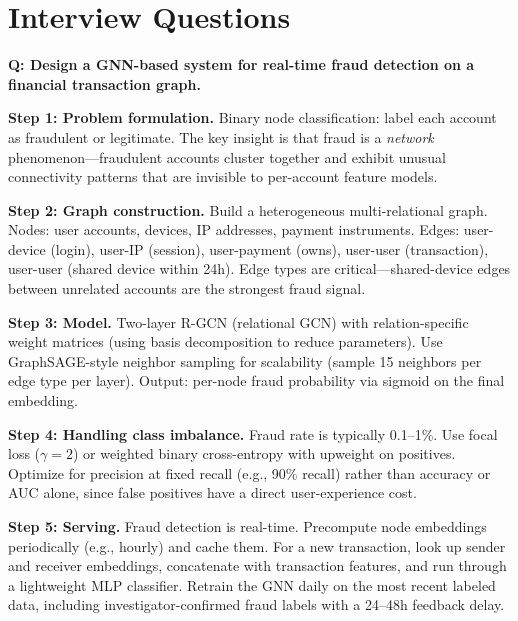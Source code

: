 \section{Interview Questions}
\label{sec:gnn_interview}

\begin{interviewq}
\textbf{Q: Design a GNN-based system for real-time fraud detection on a financial transaction graph.}

 \quad {} \quad \badgefreq{\freqmed}

\stronganswer

\textbf{Step 1: Problem formulation.} Binary node classification: label each account as fraudulent or legitimate. The key insight is that fraud is a \textit{network} phenomenon---fraudulent accounts cluster together and exhibit unusual connectivity patterns that are invisible to per-account feature models.

\textbf{Step 2: Graph construction.} Build a heterogeneous multi-relational graph. Nodes: user accounts, devices, IP addresses, payment instruments. Edges: user-device (login), user-IP (session), user-payment (owns), user-user (transaction), user-user (shared device within 24h). Edge types are critical---shared-device edges between unrelated accounts are the strongest fraud signal.

\textbf{Step 3: Model.} Two-layer R-GCN (relational GCN) with relation-specific weight matrices (using basis decomposition to reduce parameters). Use GraphSAGE-style neighbor sampling for scalability (sample 15 neighbors per edge type per layer). Output: per-node fraud probability via sigmoid on the final embedding.

\textbf{Step 4: Handling class imbalance.} Fraud rate is typically 0.1--1\%. Use focal loss ($\gamma = 2$) or weighted binary cross-entropy with upweight on positives. Optimize for precision at fixed recall (e.g., 90\% recall) rather than accuracy or AUC alone, since false positives have a direct user-experience cost.

\textbf{Step 5: Serving.} Fraud detection is real-time. Precompute node embeddings periodically (e.g., hourly) and cache them. For a new transaction, look up sender and receiver embeddings, concatenate with transaction features, and run through a lightweight MLP classifier. Retrain the GNN daily on the most recent labeled data, including investigator-confirmed fraud labels with a 24--48h feedback delay.


\end{interviewq}
